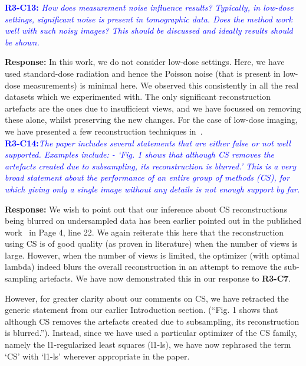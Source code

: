 \documentclass{article}
\begin{document}
\textcolor{blue}{\textbf{R3-C13:}\textit{ How does measurement noise influence results? Typically, in low-dose settings, significant noise is present in tomographic data. Does the method work well with such noisy images? This should be discussed and ideally results should be shown.}}

\textbf{Response:} In this work, we do not consider low-dose settings. Here, we have used standard-dose radiation and hence the Poisson noise (that is present in low-dose measurements) is minimal here. We observed this consistently in all the real datasets which we experimented with. The only significant reconstruction artefacts are the ones due to insufficient views, and we have focussed on removing these alone, whilst preserving the new changes.
For the case of low-dose imaging, we have presented a few reconstruction techniques in~\cite{gopal2019low}.\\

\textcolor{blue}{\textbf{R3-C14:}\textit{The paper includes several statements that are either false or not well supported. Examples include:    - `Fig. 1 shows that although CS removes the artefacts created due to subsampling, its reconstruction is blurred.' This is a very broad statement about the performance of an entire group of methods (CS), for which giving only a single image without any details is not enough support by far.}}

\textbf{Response:} We wish to point out that our inference about CS reconstructions being blurred on undersampled data has been earlier pointed out in the published work~\cite{PICCS} in Page 4, line 22.  We again reiterate this here that the reconstruction using CS is of good quality (as proven in literature) when the number of views is large. However, when the number of views is limited, the optimizer (with optimal lambda) indeed blurs the overall reconstruction in an attempt to remove the sub-sampling artefacts. We have now demonstrated this in our response to \textbf{R3-C7}.

However, for greater clarity about our comments on CS, we have retracted the generic statement from our earlier Introduction section. (``Fig. 1 shows that although CS removes the artefacts created due to subsampling, its reconstruction is blurred.''). Instead, since we have used a particular optimizer of the CS family, namely the l1-regularized least squares (l1-ls), we have now rephrased the term `CS'  with `l1-ls' wherever appropriate in the paper.\\
\end{document}
